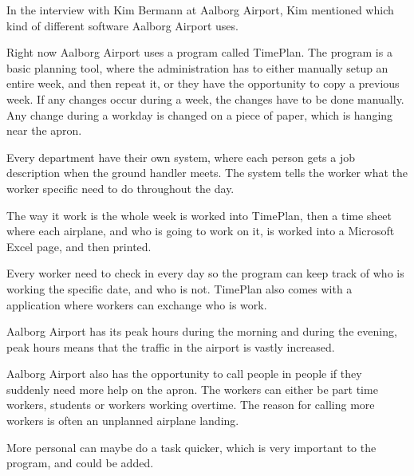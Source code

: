 In the interview with Kim Bermann at Aalborg Airport, Kim mentioned which kind of different software Aalborg Airport uses.

Right now Aalborg Airport uses a program called TimePlan.
The program is a basic planning tool, where the administration has to either manually setup an entire week, and then repeat it, or they have the opportunity to copy a previous week.
If any changes occur during a week, the changes have to be done manually. Any change during a workday is changed on a piece of paper, which is hanging near the apron.

Every department have their own system, where each person gets a job description when the ground handler meets. The system tells the worker what the worker specific need to do throughout the day.

The way it work is the whole week is worked into TimePlan, then a time sheet where each airplane, and who is going to work on it, is worked into a Microsoft Excel page, and then printed.


Every worker need to check in every day so the program can keep track of who is working the specific date, and who is not. TimePlan also comes with a application where workers can exchange who is work.


Aalborg Airport has its peak hours during the morning and during the evening, peak hours means that the traffic in the airport is vastly increased.

Aalborg Airport also has the opportunity to call people in people if they suddenly need more help on the apron. The workers can either be part time workers, students or workers working overtime.
The reason for calling more workers is often an unplanned airplane landing.

More personal can maybe do a task quicker, which is very important to the program, and could be added.



